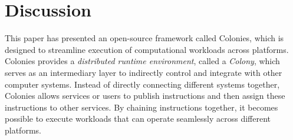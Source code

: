 \documentclass{article}
\begin{document}



\section{Discussion}
This paper has presented an open-source framework called Colonies, which is designed to streamline execution of computational workloads across platforms. Colonies provides a \emph{distributed runtime environment}, called a \emph{Colony}, which serves as an intermediary layer to indirectly control and integrate with other computer systems. Instead of directly connecting different systems together, Colonies allows services or users to publish instructions and then assign these instructions to other services. By chaining instructions together, it becomes possible to execute workloads that can operate seamlessly across different platforms. 
\end{document}
